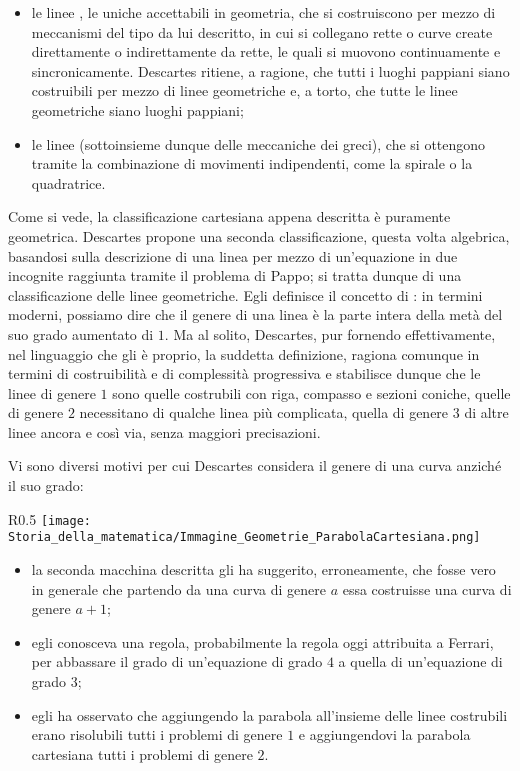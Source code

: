 \begin{itemize}
	\item le linee , le uniche accettabili in geometria, che si costruiscono per mezzo di meccanismi del tipo da lui descritto, in cui si collegano rette o curve create direttamente o indirettamente da rette, le quali si muovono continuamente e sincronicamente. Descartes ritiene, a ragione, che tutti i luoghi pappiani siano costruibili per mezzo di linee geometriche e, a torto, che tutte le linee geometriche siano luoghi pappiani;
	\item le linee  (sottoinsieme dunque delle meccaniche dei greci), che si ottengono tramite la combinazione di movimenti indipendenti, come la spirale o la quadratrice.
\end{itemize}
\par Come si vede, la classificazione cartesiana appena descritta \`e puramente geometrica. Descartes propone una seconda classificazione, questa volta algebrica, basandosi sulla descrizione di una linea per mezzo di un'equazione in due incognite raggiunta tramite il problema di Pappo; si tratta dunque di una classificazione delle linee geometriche. Egli definisce il concetto di : in termini moderni, possiamo dire che il genere di una linea \`e la parte intera della met\`a del suo grado aumentato di $1$. Ma al solito, Descartes, pur fornendo effettivamente, nel linguaggio che gli \`e proprio, la suddetta definizione, ragiona comunque in termini di costruibilit\`a e di complessit\`a progressiva e stabilisce dunque che le linee di genere $1$ sono quelle costrubili con riga, compasso e sezioni coniche, quelle di genere $2$ necessitano di qualche linea pi\`u complicata, quella di genere $3$ di altre linee ancora e cos\`i via, senza maggiori precisazioni.
\par Vi sono diversi motivi per cui Descartes considera il genere di una curva anzich\'e il suo grado:
\begin{wrapfigure}{R}{0.5\textwidth}
	\texttt{[image: Storia\_della\_matematica/Immagine\_Geometrie\_ParabolaCartesiana.png]}
	\caption{La parabola cartesiana.}
	\label{Geometrie_ParabolaCartesiana}
\end{wrapfigure}
\begin{itemize}
	\item la seconda macchina descritta gli ha suggerito, erroneamente, che fosse vero in generale che partendo da una curva di genere $a$ essa costruisse una curva di genere $a + 1$;
	\item egli conosceva una regola, probabilmente la regola oggi attribuita a Ferrari, per abbassare il grado di un'equazione di grado $4$ a quella di un'equazione di grado $3$;
	\item egli ha osservato che aggiungendo la parabola all'insieme delle linee costrubili erano risolubili tutti i problemi di genere $1$ e aggiungendovi la parabola cartesiana tutti i problemi di genere $2$.
\end{itemize}
